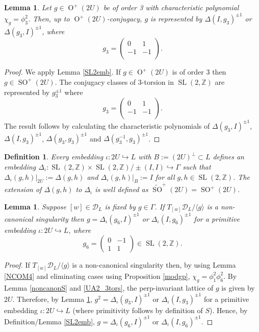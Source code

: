 \documentclass[12pt, a4paper]{article}
\newtheorem{lemma}[thm]{Lemma}
\newtheorem{defn}[thm]{Definition}
\newcommand{\ZZ}{\mathbb{Z}}
\newcommand{\la}{\langle}
\newcommand{\ra}{\rangle}
\newcommand{\dc}{\mathcal{D}}
\newcommand{\opn}{\operatorname}
\begin{document}
\begin{lemma}\label{2Utorsion}
  Let $g \in \opn{O}^+(2U)$ be of order 3 with characteristic polynomial $\chi_g=\phi_3^2$.
  Then, up to $\opn{O}^+(2U)$-conjugacy, $g$ is represented by  $\Delta(I, g_3)^{\pm 1}$ or $\Delta(g_3, I)^{\pm 1}$, where
\[
  g_3 =
    \begin{pmatrix}
      0 & 1 \\
      -1 & -1 \\
    \end{pmatrix}.
 \]
\end{lemma}
\begin{proof}
  We apply Lemma \ref{SL2emb}.
  If $g \in \opn{O}^+(2U)$ is of order 3 then $g \in \opn{SO}^+(2U)$.
  The conjugacy classes of 3-torsion in $\opn{SL}(2, \ZZ)$ are represented by $g_3^{\pm 1}$ \cite{Serre} where
\[
  g_3 =
    \begin{pmatrix}
      0 & 1 \\
      -1 & -1 \\
    \end{pmatrix}.
    \]
    The result follows by calculating the characteristic polynomials of
    $\Delta(g_3, I)^{\pm 1}$, 
    $\Delta(I, g_3)^{\pm 1}$, 
    $\Delta(g_3, g_3)^{\pm 1}$ and
    $\Delta(g_3^{-1}, g_3)^{\pm 1}$.
\end{proof}
\begin{defn}
  Every embedding
  $\iota: 2U \hookrightarrow L$ with $B := (2U)^{\perp} \subset L$
  defines an embedding
  $\Delta_{\iota}: \opn{SL}(2, \ZZ) \times \opn{SL}(2, \ZZ)/ \pm (I, I) \hookrightarrow \Gamma$
  such that
  $\Delta_{\iota}(g,h) \vert_{2U}:=\Delta(g,h)$ and
  $\Delta_{\iota}(g,h) \vert_B := I$
  for all $g,h \in \opn{SL}(2, \ZZ)$.
  The extension of $\Delta(g,h)$ to $\Delta_{\iota}$ is well defined as $\widetilde{\opn{SO}}^+(2U) = \opn{SO}^+(2U)$. 
\end{defn}
\begin{lemma}\label{DeltaLemma}
  Suppose $[w] \in \dc_L$ is fixed by $g \in \Gamma$.
  If $T_{[w]} \dc_L / \la g \ra$ is a non-canonical singularity then $g = \Delta_{\iota}(g_6, I)^{\pm 1}$ or $\Delta_{\iota}(I, g_6)^{\pm 1}$ for a primitive embedding $\iota: 2U \hookrightarrow L$, where
  \begin{equation*}
    g_6=
    \begin{pmatrix}
      0 & -1 \\
      1 & 1
    \end{pmatrix} \in \opn{SL}(2, \ZZ).
  \end{equation*}
\end{lemma}
\begin{proof}
  If $T_{[w]} \dc_L / \la g \ra$ is a non-canonical singularity then, by using Lemma \ref{NCOM4} and eliminating cases using Proposition \ref{modgp}, $\chi_g=\phi_1^2 \phi_6^2$.
  By Lemma \ref{noncanonS} and \ref{UA2_3tors}, the perp-invariant lattice of $g$ is given by $2U$.
  Therefore, by Lemma \ref{2Utorsion}, $g^2 = \Delta_{\iota}(g_3, I)^{\pm 1}$ or $\Delta_{\iota}(I, g_3)^{\pm 1}$ for a primitive embedding $\iota: 2U \hookrightarrow L$ (where primitivity follows by definition of $S$).
  Hence, by Definition/Lemma \ref{SL2emb},
  $g = \Delta_{\iota}(g_6, I)^{\pm 1}$ or $\Delta_{\iota}(I, g_6)^{\pm 1}$. 
\end{proof}
\end{document}
